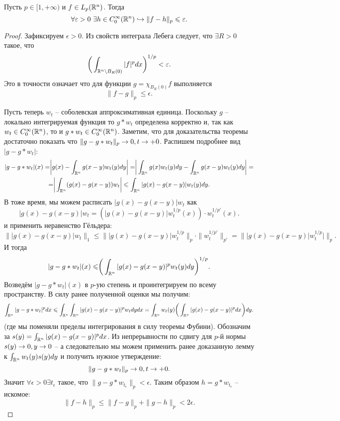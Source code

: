 \begin{theorem}
    Пусть $p \in [1, +\infty)$ и $f \in L_p(\mathbb{R}^n)$. Тогда
    \[
        \forall \varepsilon > 0  \ \exists h \in C^{\infty}_0(\mathbb{R}^n) \hookrightarrow \|f - h\|_p \leqslant \varepsilon.
    \]
\end{theorem}
\begin{proof}
    Зафиксируем $\epsilon > 0$.
    Из свойств интеграла Лебега следует, что $\exists R > 0$ такое, что
    \[
        \biggr(\int_{\mathbb{R}^n \setminus B_R(0)} |f|^p dx\biggr)^{1/p} < \varepsilon.
    \]
    Это в точности означает что для функции $g = \chi_{B_R(0)}f$ выполняется
    \[
        \|f - g\|_p \leq \epsilon.
    \]
    
    Пусть теперь $w_t$ -- соболевская аппроксимативная единица.
    Поскольку $g$ -- локально интегрируемая функция то $g * w_t$ определена корректно и, так как $w_t \in C_0^\infty(\mathbb{R}^n)$, то и $g * w_t \in C_0^\infty(\mathbb{R}^n)$.
    Заметим, что для доказательства теоремы достаточно показать что $\|g - g * w_t\|_p \rightarrow 0, t \rightarrow +0$.
    Распишем подробнее вид $|g - g * w_t|$:
    \begin{multline*}
        |g - g * w_t|(x) = \biggr| g(x) - \int_{\mathbb{R}^n} g(x - y)w_t(y)dy \biggr| = \biggr|\int_{\mathbb{R}^n} g(x)w_t(y)dy - \int_{\mathbb{R}^n} g(x - y)w_t(y)dy\biggr| = \\ = \biggr|\int_{\mathbb{R}^n} (g(x) - g(x - y))w_t\biggr| \leqslant \int_{\mathbb{R}^n} |g(x) - g(x - y)|w_t(y)dy.
    \end{multline*}
    В тоже время, мы можем расписать $|g(x) - g(x - y)|w_t$ как \[|g(x) - g(x - y)|w_t = (|g(x) - g(x - y)|w_t^{1/p}(x)) \cdot w_t^{1/p'}(x).\]
    и применить неравенство Гёльдера:
    \[
        \||g(x) - g(x - y)|w_t\|_1 \leq \||g(x) - g(x - y)|w_t^{1/p}\|_p \cdot \|w_t^{1/p'}\|_{p'} = \||g(x) - g(x - y)|w_t^{1/p}|\|_p.
    \]
    И тогда
    \[
        |g - g * w_t|(x) \leqslant \biggr( \int_{\mathbb{R}^n}|g(x) - g(x - y)|^p w_t(y)dy \biggr)^{1/p}.
    \]
    Возведём $|g - g * w_t|(x)$ в $p$-ую степень и проинтегрируем по всему пространству.
    В силу ранее полученной оценки мы получим:
    \[
        \int_{\mathbb{R}^n}|g - g * w_t|^p dx \leqslant \int_{\mathbb{R}^n} \int_{\mathbb{R}^n} |g(x) - g(x - y)|^p w_t dy dx = \int_{\mathbb{R}^n} w_t(y) \biggr(\int_{\mathbb{R}^n} |g(x) - g(x - y)|^{p} dx \biggr) dy.
    \]
    (где мы поменяли пределы интегрирования в силу теоремы Фубини).
    Обозначим за $s(y) = \int_{\mathbb{R}^n}|g(x) - g(x - y)|^p dx$.
    Из непрерывности по сдвигу для $p$-й нормы $s(y) \rightarrow 0, y \rightarrow 0$ -- а следовательно мы можем применить ранее доказанную лемму к $\int_{\mathbb{R}^n}w_t(y)s(y)dy$ и получить нужное утверждение:
    \[
        \|g - g * w_t\|_p \rightarrow 0, t \rightarrow +0.
    \]
    Значит $\forall \epsilon > 0 \exists t_{\epsilon}$ такое, что $\|g - g * w_{t_\epsilon}\|_p < \epsilon$.
    Таким образом $h = g * w_{t_\epsilon}$ -- искомое:
    \[
        \|f - h\|_p \leq \|f - g\|_p + \|g - h\|_p < 2\epsilon.
    \]
\end{proof}

